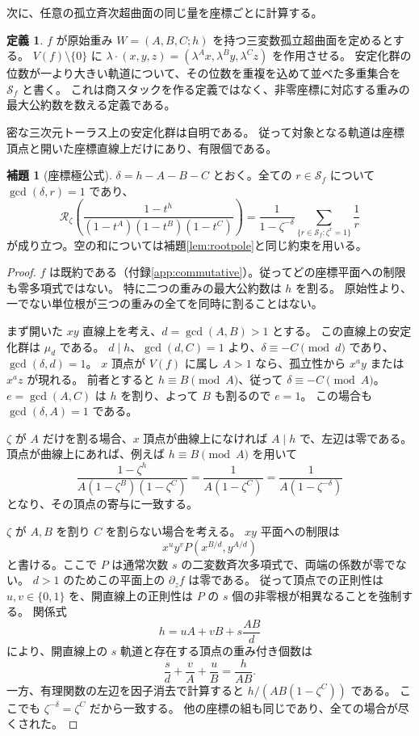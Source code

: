 \documentclass[11pt,a4paper]{ltjsarticle}
\numberwithin{equation}{section}
\theoremstyle{definition}
\newtheorem{lemma}[theorem]{補題}
\newtheorem{definition}[theorem]{定義}
\newcommand{\Res}{\mathcal R}\newcommand{\Sig}{\mathcal A}\newcommand{\mf}{\mathfrak m}
\begin{document}
次に、任意の孤立斉次超曲面の同じ量を座標ごとに計算する。
\begin{definition}\label{def:coordinateorders}
$f$ が原始重み $W=(A,B,C;h)$ を持つ三変数孤立超曲面を定めるとする。
$V(f)\setminus\{0\}$ に $\lambda\cdot(x,y,z)=(\lambda^Ax,\lambda^By,\lambda^Cz)$ を作用させる。
安定化群の位数が一より大きい軌道について、その位数を重複を込めて並べた多重集合を $\mathcal S_f$ と書く。
これは商スタックを作る定義ではなく、非零座標に対応する重みの最大公約数を数える定義である。
\end{definition}
密な三次元トーラス上の安定化群は自明である。
従って対象となる軌道は座標頂点と開いた座標直線上だけにあり、有限個である。

\begin{lemma}[座標極公式]\label{lem:coordinatepole}
$\delta=h-A-B-C$ とおく。全ての $r\in\mathcal S_f$ について $\gcd(\delta,r)=1$ であり、
\begin{equation}\label{eq:coordinatepole}
 \Res_\zeta\!\left(\frac{1-t^h}{(1-t^A)(1-t^B)(1-t^C)}\right)
 =\frac{1}{1-\zeta^{-\delta}}
   \sum_{\{r\in\mathcal S_f:\zeta^r=1\}}\frac1r
\end{equation}
が成り立つ。空の和については補題\ref{lem:rootpole}と同じ約束を用いる。
\end{lemma}
\begin{proof}
$f$ は既約である（付録\ref{app:commutative}）。従ってどの座標平面への制限も零多項式ではない。
特に二つの重みの最大公約数は $h$ を割る。
原始性より、一でない単位根が三つの重みの全てを同時に割ることはない。

まず開いた $xy$ 直線上を考え、$d=\gcd(A,B)>1$ とする。
この直線上の安定化群は $\mu_d$ である。
$d\mid h$、$\gcd(d,C)=1$ より、$\delta\equiv-C\pmod d$ であり、$\gcd(\delta,d)=1$。
$x$ 頂点が $V(f)$ に属し $A>1$ なら、孤立性から $x^a y$ または $x^a z$ が現れる。
前者とすると $h\equiv B\pmod A$、従って $\delta\equiv-C\pmod A$。
$e=\gcd(A,C)$ は $h$ を割り、よって $B$ も割るので $e=1$。
この場合も $\gcd(\delta,A)=1$ である。

$\zeta$ が $A$ だけを割る場合、$x$ 頂点が曲線上になければ $A\mid h$ で、左辺は零である。
頂点が曲線上にあれば、例えば $h\equiv B\pmod A$ を用いて
\[
 \frac{1-\zeta^h}{A(1-\zeta^B)(1-\zeta^C)}
 =\frac1{A(1-\zeta^C)}
 =\frac1{A(1-\zeta^{-\delta})}
\]
となり、その頂点の寄与に一致する。

$\zeta$ が $A,B$ を割り $C$ を割らない場合を考える。
$xy$ 平面への制限は
\[
 x^u y^v P(x^{B/d},y^{A/d})
\]
と書ける。ここで $P$ は通常次数 $s$ の二変数斉次多項式で、両端の係数が零でない。
$d>1$ のためこの平面上の $\partial_z f$ は零である。
従って頂点での正則性は $u,v\in\{0,1\}$ を、開直線上の正則性は $P$ の $s$ 個の非零根が相異なることを強制する。
関係式
\[
 h=uA+vB+s\frac{AB}{d}
\]
により、開直線上の $s$ 軌道と存在する頂点の重み付き個数は
\[
 \frac{s}{d}+\frac{v}{A}+\frac{u}{B}=\frac{h}{AB}.
\]
一方、有理関数の左辺を因子消去で計算すると
$h/(AB(1-\zeta^C))$ である。
ここでも $\zeta^{-\delta}=\zeta^C$ だから一致する。
他の座標の組も同じであり、全ての場合が尽くされた。
\end{proof}
\end{document}
